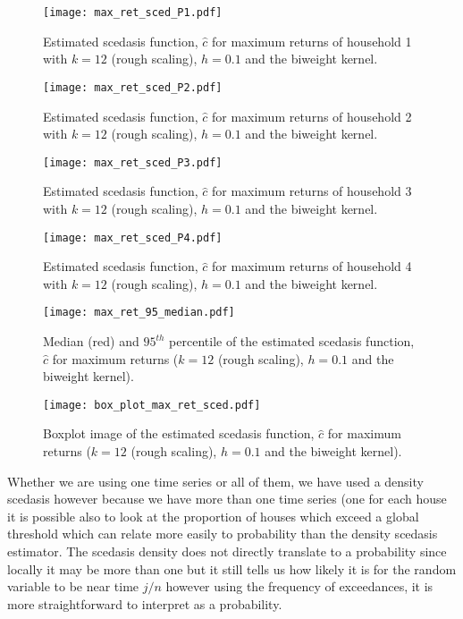 \documentclass[a4paper]{article}
\begin{document}
\begin{figure}
\centering
\texttt{[image: max\_ret\_sced\_P1.pdf]}
\caption{\label{fig:max_ret_sced_P1} Estimated scedasis function, $\hat{c}$ for maximum returns of household 1 with $k=12$  (rough scaling), $h=0.1$ and the biweight kernel.}
\end{figure}

\begin{figure}
\centering
\texttt{[image: max\_ret\_sced\_P2.pdf]}
\caption{\label{fig:max_ret_sced_P2} Estimated scedasis function, $\hat{c}$ for maximum returns of household 2 with $k=12$ (rough scaling), $h=0.1$ and the biweight kernel.}
\end{figure}

\begin{figure}
\centering
\texttt{[image: max\_ret\_sced\_P3.pdf]}
\caption{\label{fig:max_ret_sced_P3} Estimated scedasis function, $\hat{c}$ for maximum returns of household 3 with $k=12$ (rough scaling), $h=0.1$ and the biweight kernel.}
\end{figure}

\begin{figure}
\centering
\texttt{[image: max\_ret\_sced\_P4.pdf]}
\caption{\label{fig:max_ret_sced_P4} Estimated scedasis function, $\hat{c}$ for maximum returns of household 4 with $k=12$ (rough scaling), $h=0.1$ and the biweight kernel.}
\end{figure}

\begin{figure}
\centering
\texttt{[image: max\_ret\_95\_median.pdf]}
\caption{\label{fig:max_ret_sced_95_50} Median (red) and $95^{th}$ percentile of the estimated scedasis function, $\hat{c}$ for maximum returns ($k=12$ (rough scaling), $h=0.1$ and the biweight kernel).}
\end{figure}

\begin{figure}
\centering
\texttt{[image: box\_plot\_max\_ret\_sced.pdf]}
\caption{\label{fig:max_ret_sced_boxplot} Boxplot image of the estimated scedasis function, $\hat{c}$ for maximum returns ($k=12$ (rough scaling), $h=0.1$ and the biweight kernel).}
\end{figure}


Whether we are using one time series or all of them, we have used a density scedasis however because we have more than one time series (one for each house it is possible also to look at the proportion of houses which exceed a global threshold which can relate more easily to probability than the density scedasis estimator. The scedasis density does not directly translate to a probability since locally it may be more than one but it still tells us how likely it is for the random variable to be near time $j/n$ however using the frequency of exceedances, it is more straightforward to interpret as a probability.
\end{document}
